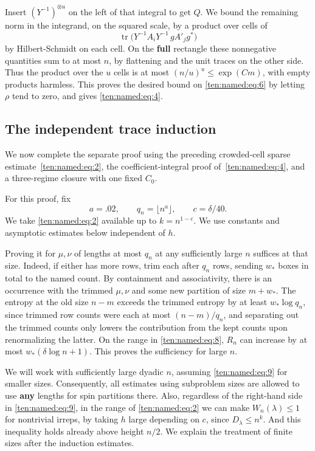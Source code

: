 Insert \((Y^{-1})^{\otimes u}\) on the left of that integral to get \(Q\). We bound the remaining norm in the integrand, on the squared scale, by a product over cells of
\[
 \operatorname{tr}\big( Y^{-1} A_i Y^{-1}\, g A'_j g^*\big)
\]
by Hilbert-Schmidt on each cell. On the \textbf{full} rectangle these nonnegative quantities sum to at most \(n\), by flattening and the unit traces on the other side. Thus the product over the \(u\) cells is at most \((n/u)^u\le \exp(Cm)\), with empty products harmless. This proves the desired bound on \eqref{ten:named:eq:6} by letting \(\rho\) tend to zero, and gives \eqref{ten:named:eq:4}.

\subsection{The independent trace induction}
We now complete the separate proof using the preceding crowded-cell sparse estimate~\eqref{ten:named:eq:2}, the coefficient-integral proof of~\eqref{ten:named:eq:4}, and a three-regime closure with one fixed $C_0$.

For this proof, fix
\[
 a=.02,\qquad q_n=\lfloor n^a\rfloor,\qquad c=\delta/40.
\]
We take \eqref{ten:named:eq:2} available up to \(k=n^{1-c}\). We use constants and asymptotic estimates below independent of \(h\).

Proving it for \(\mu,\nu\) of lengths at most \(q_n\) at any sufficiently large \(n\) suffices at that size. Indeed, if either has more rows, trim each after \(q_n\) rows, sending \(w_*\) boxes in total to the named count. By containment and associativity, there is an occurrence with the trimmed \(\mu,\nu\) and some new partition of size \(m+w_*\). The entropy at the old size \(n-m\) exceeds the trimmed entropy by at least \(w_*\log q_n\), since trimmed row counts were each at most \((n-m)/q_n\), and separating out the trimmed counts only lowers the contribution from the kept counts upon renormalizing the latter. On the range in \eqref{ten:named:eq:8}, \(R_n\) can increase by at most \(w_* (\delta\log n+1)\). This proves the sufficiency for large \(n\).

We will work with sufficiently large dyadic \(n\), assuming \eqref{ten:named:eq:9} for smaller sizes. Consequently, all estimates using subproblem sizes are allowed to use \textbf{any} lengths for spin partitions there. Also, regardless of the right-hand side in \eqref{ten:named:eq:9}, in the range of \eqref{ten:named:eq:2} we can make \(W_n(\lambda)\le 1\) for nontrivial irreps, by taking \(h\) large depending on \(c\), since \(D_\lambda\le n^k\). And this inequality holds already above height \(n/2\). We explain the treatment of finite sizes after the induction estimates.

